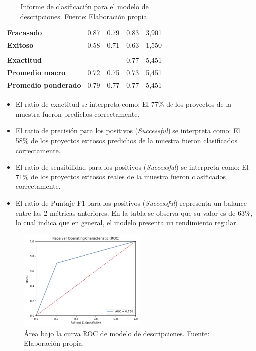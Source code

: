 \begin{table}[h!]
	\centering
	\small
	\begin{tabular}{ |m{4.5cm}|m{2.5cm}|m{2.5cm}|m{2.5cm}|m{2.5cm}|  }
		\hline
		\rowcolor{bluejean}
		\Centering \color{white}{Valor}& \Centering \color{white}{Precisión}& \Centering \color{white}{Sensibilidad}& \Centering \color{white}{Puntaje F1}& \Centering \color{white}{Muestras}\\
		\hline
		\textbf{Fracasado} & 0.87 & 0.79 & 0.83 & 3,901 \\
		\hline
		\textbf{Exitoso} & 0.58 & 0.71 & 0.63 & 1,550 \\
		\hline
		\rowcolor{turq}
		\multicolumn{5}{c}{ } \\
		\hline
		\textbf{Exactitud} &  &	 & 0.77 & 5,451 \\
		\hline
		\textbf{Promedio macro} & 0.72 & 0.75 & 0.73 & 5,451 \\
		\hline
		\textbf{Promedio ponderado} & 0.79 & 0.77 & 0.77 & 5,451 \\
		\hline
	\end{tabular}
	\caption{Informe de clasificación para el modelo de descripciones. Fuente: Elaboración propia.}
	\label{5:table2}
\end{table}

\begin{itemize}
	\item El ratio de exactitud se interpreta como: El 77\% de los proyectos de la muestra fueron predichos correctamente.
	\item El ratio de precisión para los positivos (\textit{Successful}) se interpreta como: El 58\% de los proyectos exitosos predichos de la muestra fueron clasificados correctamente. 
	\item El ratio de sensibilidad para los positivos (\textit{Successful}) se interpreta como: El 71\% de los proyectos exitosos reales de la muestra fueron clasificados correctamente.
	\item El ratio de Puntaje F1 para los positivos (\textit{Successful}) representa un balance entre las 2 métricas anteriores. En la tabla se observa que su valor es de 63\%, lo cual indica que en general, el modelo presenta un rendimiento regular.
\end{itemize}

\begin{figure}[!ht]
	\begin{center}
		\includegraphics[width=0.55\textwidth]{5/figures/description_auc.png}
		\caption{Área bajo la curva ROC de modelo de descripciones. Fuente: Elaboración propia.}
		\label{5:fig6}
	\end{center}
\end{figure}

